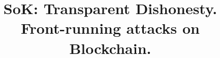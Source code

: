 \documentclass[envcountsect]{llncs}
\begin{document}
\frontmatter
\mainmatter

\title{SoK: Transparent Dishonesty. Front-running attacks on Blockchain. }
\maketitle










\clearpage




\end{document}
